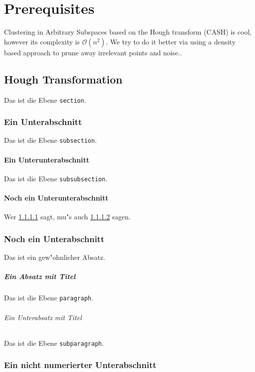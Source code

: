 \chapter{Prerequisites}

Clustering in Arbitrary Subspaces based on the Hough transform (CASH) is cool, however its complexity is $\mathcal{O}(n^2)$.
We try to do it better via using a density based approach to prune away irrelevant points and noise..

\section{Hough Transformation}

Das ist die Ebene {\tt section}.

\subsection{Ein Unterabschnitt}

Das ist die Ebene {\tt subsection}.

\subsubsection{Ein Unterunterabschnitt}
\label{sec:a}

Das ist die Ebene {\tt subsubsection}.

\subsubsection{Noch ein Unterunterabschnitt}
\label{sec:b}

Wer \ref{sec:a} sagt, mu"s auch \ref{sec:b} sagen.

\subsection{Noch ein Unterabschnitt}

Das ist ein gew"ohnlicher Absatz.

\paragraph{Ein Absatz mit Titel}

Das ist die Ebene {\tt paragraph}.

\subparagraph{Ein Unterabsatz mit Titel}

Das ist die Ebene {\tt subparagraph}.

\subsection*{Ein nicht numerierter Unterabschnitt}

